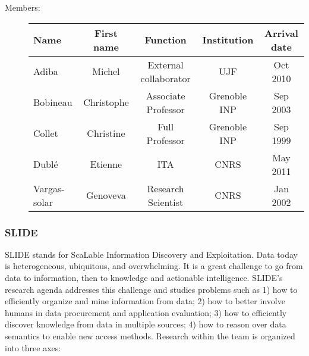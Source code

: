 \begin{description}

\item[Members:] 

\begin{center}\begin{tabular}{|p{2.5cm}|*{4}{c|}}
\hline 
Name & First name & Function & Institution & Arrival date\\\hline \hline %
Adiba & Michel & External collaborator  & UJF & Oct 2010\\\hline
Bobineau & Christophe & Associate Professor & Grenoble INP & Sep 2003 \\\hline
Collet & Christine & Full Professor & Grenoble INP & Sep 1999 \\\hline
Dubl{\'e} & Etienne & ITA  & CNRS & May 2011\\\hline
Vargas-solar & Genoveva & Research Scientist & CNRS & Jan 2002 \\\hline
\hline
\end{tabular}\end{center}
\makeatother

\end{description}



\subsubsection*{SLIDE }


SLIDE stands for ScaLable Information Discovery and Exploitation. Data
today is heterogeneous, ubiquitous, and overwhelming. It is a great
challenge to go from data to information, then to knowledge and
actionable intelligence. SLIDE's research agenda addresses this
challenge and studies problems such as 1) how to efficiently organize
and mine information from data; 2) how to better involve humans in
data procurement and application evaluation; 3) how to efficiently
discover knowledge from data in multiple sources; 4) how to reason
over data semantics to enable new access methods. Research within the
team is organized into three axes:


